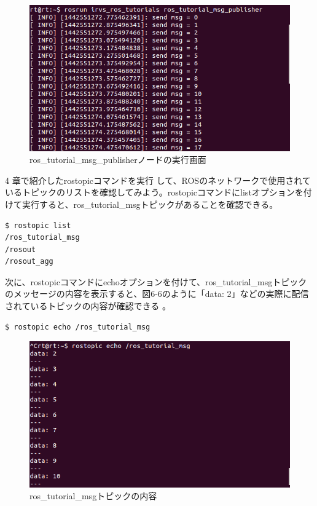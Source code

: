 \begin{figure}[htp]
  \centering
  \includegraphics[width=\columnwidth]{pictures/chapter6/pic_06_05.png}
  \caption{ros\_tutorial\_msg\_publisherノードの実行画面}
\end{figure}

4  章で紹介したrostopicコマンドを実行  して、ROSのネットワークで使用されているトピックのリストを確認してみよう。rostopicコマンドにlistオプションを付けて実行すると、ros\_tutorial\_msgトピックがあることを確認できる。

\begin{lstlisting}[language=ROS]
$ rostopic list
/ros_tutorial_msg
/rosout
/rosout_agg
\end{lstlisting}

次に、rostopicコマンドにechoオプションを付けて、ros\_tutorial\_msgトピックのメッセージの内容を表示すると、図6-6のように「data: 2」などの実際に配信されているトピックの内容が確認できる  。

\begin{lstlisting}[language=ROS]
$ rostopic echo /ros_tutorial_msg
\end{lstlisting}

\begin{figure}[htp]
  \centering
  \includegraphics[width=\columnwidth]{pictures/chapter6/pic_06_06.png}
  \caption{ros\_tutorial\_msgトピックの内容}
\end{figure}


